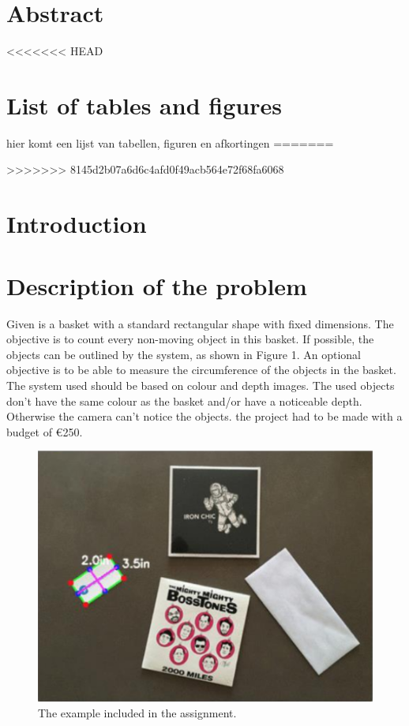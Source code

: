 \documentclass{article}
\begin{document}


\section*{Abstract}
\thispagestyle{empty}

\newpage
\tableofcontents
\thispagestyle{empty}

\newpage
\listoftables
\thispagestyle{empty}

<<<<<<< HEAD
\tableofcontents

\section{List of tables and figures}
hier komt een lijst van tabellen, figuren en afkortingen
=======
\newpage
\listoffigures
\thispagestyle{empty}
>>>>>>> 8145d2b07a6d6c4afd0f49acb564e72f68fa6068

\newpage
\section{Introduction}

\section{Description of the problem}

\noindent Given is a basket with a standard rectangular shape with fixed dimensions. The objective is to count every non-moving object in this basket. If possible, the objects can be outlined by the system, as shown in Figure 1. An optional objective is to be able to measure the circumference of the objects in the basket.\\

\noindent The system used should be based on colour and depth images. The used objects don't have the same colour as the basket and/or have a noticeable depth. Otherwise the camera can't notice the objects. the project had to be made with a budget of \euro 250.\\

\begin{figure}[h!]
  \includegraphics[width=0.7\linewidth]{opdracht.png}
  \caption{The example included in the assignment.}
\end{figure}
\end{document}

